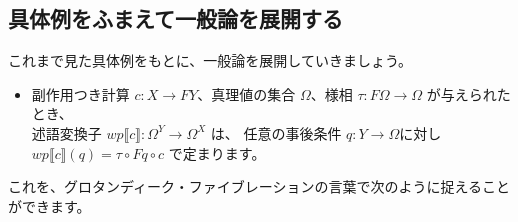 \documentclass[
		head_space=20mm,
		foot_space=20mm,
		gutter=10mm,
		line_length=190mm
]{jlreq}
\begin{document}
\clearpage

\subsection{具体例をふまえて一般論を展開する}

\noindent 
これまで見た具体例をもとに、一般論を展開していきましょう。

\begin{itemize}
	\item 副作用つき計算 $c:X\to FY$、真理値の集合 $\Omega$、様相 $\tau:F\Omega\to\Omega$ が与えられたとき、\\ 述語変換子 $wp\llbracket c\rrbracket:\Omega^Y\to\Omega^X$ は、%
	任意の事後条件 $q:Y\to\Omega$に対し $wp\llbracket c\rrbracket (q)=\tau\circ Fq\circ c$ で定まります。
	\begin{prooftree}
	\end{prooftree}\vspace{2pt}
\end{itemize}

\noindent 
これを、グロタンディーク・ファイブレーションの言葉で次のように捉えることができます。
\end{document}
